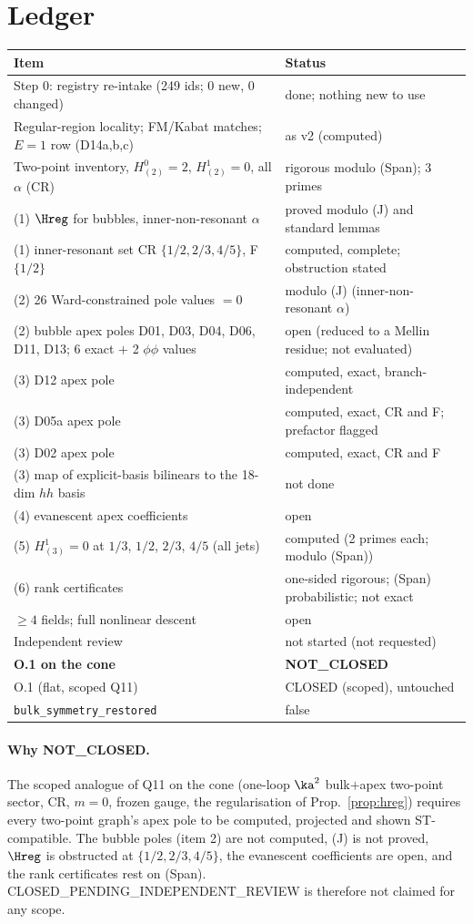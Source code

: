 \section{Ledger}
\begin{longtable}{p{}p{}}\toprule
Item & Status\\\midrule
Step 0: registry re-intake (249 ids; 0 new, 0 changed) & done; nothing new to use\\
Regular-region locality; FM/Kabat matches; $E=1$ row (D14a,b,c) & as v2 (computed)\\
Two-point inventory, $H^0_{(2)}=2$, $H^1_{(2)}=0$, all $\alpha$ (CR) & rigorous modulo (Span); 3 primes\\
(1) $\Hreg$ for bubbles, inner-non-resonant $\alpha$ & proved modulo (J) and standard lemmas\\
(1) inner-resonant set CR $\{1/2,2/3,4/5\}$, F $\{1/2\}$ & computed, complete; obstruction stated\\
(2) 26 Ward-constrained pole values $=0$ & modulo (J) (inner-non-resonant $\alpha$)\\
(2) bubble apex poles D01, D03, D04, D06, D11, D13; 6 exact $+$ 2 $\phi\phi$ values & open (reduced to a Mellin residue; not evaluated)\\
(3) D12 apex pole & computed, exact, branch-independent\\
(3) D05a apex pole & computed, exact, CR and F; prefactor flagged\\
(3) D02 apex pole & computed, exact, CR and F\\
(3) map of explicit-basis bilinears to the 18-dim $hh$ basis & not done\\
(4) evanescent apex coefficients & open\\
(5) $H^1_{(3)}=0$ at $1/3$, $1/2$, $2/3$, $4/5$ (all jets) & computed (2 primes each; modulo (Span))\\
(6) rank certificates & one-sided rigorous; (Span) probabilistic; not exact\\
$\ge4$ fields; full nonlinear descent & open\\
Independent review & not started (not requested)\\\midrule
\textbf{O.1 on the cone} & \textbf{NOT\_CLOSED}\\
O.1 (flat, scoped Q11) & CLOSED (scoped), untouched\\
\texttt{bulk\_symmetry\_restored} & false\\\bottomrule
\end{longtable}
\paragraph{Why NOT\_CLOSED.} The scoped analogue of Q11 on the cone (one-loop $\ka^2$ bulk$+$apex two-point sector, CR, $m=0$, frozen gauge, the regularisation of Prop.~\ref{prop:hreg}) requires every two-point graph's apex pole to be computed, projected and shown ST-compatible. The bubble poles (item 2) are not computed, (J) is not proved, $\Hreg$ is obstructed at $\{1/2,2/3,4/5\}$, the evanescent coefficients are open, and the rank certificates rest on (Span). CLOSED\_PENDING\_INDEPENDENT\_REVIEW is therefore not claimed for any scope.

